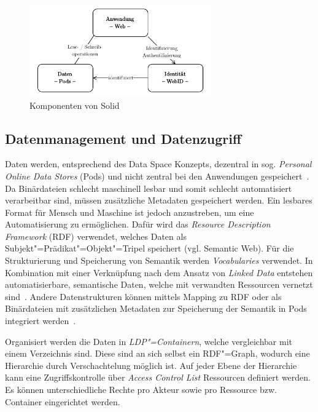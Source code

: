 \begin{figure}[b]
    \includegraphics[width=0.7\textwidth]{./assets/solid_triangle.drawio.pdf}
    \caption{Komponenten von Solid}
    \label{fig:solid-components}
\end{figure}


\subsection{Datenmanagement und Datenzugriff}

Daten werden, entsprechend des Data Space Konzepts, dezentral in sog. \emph{Personal Online Data Stores} (Pods) und nicht zentral bei den Anwendungen gespeichert~\cite{mecklerWebLinkedData2023}.
Da Binärdateien schlecht maschinell lesbar und somit schlecht automatisiert verarbeitbar sind, müssen zusätzliche Metadaten gespeichert werden.
Ein lesbares Format für Mensch und Maschine ist jedoch anzustreben, um eine Automatisierung zu ermöglichen.
Dafür wird das \emph{Resource Description Framework} (RDF) verwendet, welches Daten als Subjekt"=Prädikat"=Objekt"=Tripel speichert (vgl. Semantic Web).
Für die Strukturierung und Speicherung von Semantik werden \emph{Vocabularies} verwendet.
In Kombination mit einer Verknüpfung nach dem Ansatz von \emph{Linked Data} entstehen automatisierbare, semantische Daten, welche mit verwandten Ressourcen vernetzt sind~\cite{bizerLinkedDataStory2009,mecklerWebLinkedData2023,sambraSolidPlatformDecentralized2016}.
Andere Datenstrukturen können mittels Mapping zu RDF oder als Binärdateien mit zusätzlichen Metadaten zur Speicherung der Semantik in Pods integriert werden~\cite{mecklerWebLinkedData2023,sambraSolidPlatformDecentralized2016}.

Organisiert werden die Daten in \emph{LDP"=Containern}, welche vergleichbar mit einem Verzeichnis sind.
Diese sind an sich selbst ein RDF"=Graph, wodurch eine Hierarchie durch Verschachtelung möglich ist.
Auf jeder Ebene der Hierarchie kann eine Zugriffskontrolle über \emph{Access Control List} Ressourcen definiert werden.
Es können unterschiedliche Rechte pro Akteur sowie pro Ressource bzw. Container eingerichtet werden.

